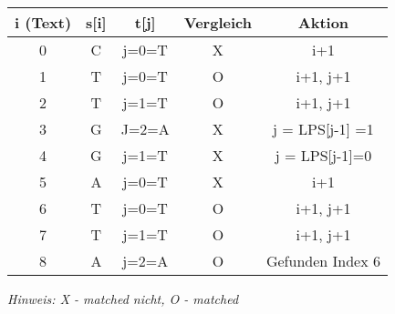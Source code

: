 \begin{tabular}{|c|c|c|c|c|}
	\hline
	i (Text) & s[i] & t[j] & Vergleich & Aktion \\
	\hline
	0 & C & j=0=T & X & i+1 \\
	\hline
	1 & T & j=0=T & O & i+1, j+1 \\
	\hline
	2 & T & j=1=T & O & i+1, j+1 \\
	\hline
	3 & G & J=2=A & X & j = LPS[j-1] =1 \\
	\hline
	4 & G & j=1=T & X & j = LPS[j-1]=0 \\
	\hline
	5 & A & j=0=T & X & i+1 \\
	\hline
	6 & T & j=0=T & O & i+1, j+1 \\
	\hline
	7 & T & j=1=T & O & i+1, j+1 \\
	\hline
	8 & A & j=2=A & O & Gefunden Index 6 \\
	\hline
\end{tabular}

\noindent
\textit{Hinweis: X - matched nicht, O - matched}